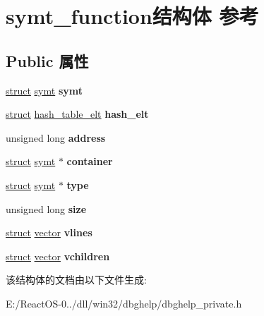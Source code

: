 \hypertarget{structsymt__function}{}\section{symt\+\_\+function结构体 参考}
\label{structsymt__function}
\subsection*{Public 属性}
\begin{DoxyCompactItemize}
\item 
\mbox{\label{structsymt__function_ab8e0ecde813260484098765a2e58fce7}} 
\hyperlink{interfacestruct}{struct} \hyperlink{structsymt}{symt} {\bfseries symt}
\item 
\mbox{\label{structsymt__function_a8b698ed85d7d9eef5dfd84605f43b484}} 
\hyperlink{interfacestruct}{struct} \hyperlink{structhash__table__elt}{hash\+\_\+table\+\_\+elt} {\bfseries hash\+\_\+elt}
\item 
\mbox{\label{structsymt__function_a9ab1fce58054ec492faecba2ad368433}} 
unsigned long {\bfseries address}
\item 
\mbox{\label{structsymt__function_acf8d323e19bd1b8bf5462a8b9cfa353b}} 
\hyperlink{interfacestruct}{struct} \hyperlink{structsymt}{symt} $\ast$ {\bfseries container}
\item 
\mbox{\label{structsymt__function_a9fd7193e227e518dcaa3842133b3344e}} 
\hyperlink{interfacestruct}{struct} \hyperlink{structsymt}{symt} $\ast$ {\bfseries type}
\item 
\mbox{\label{structsymt__function_a7de13c1133898a65769144ee4a3bbf48}} 
unsigned long {\bfseries size}
\item 
\mbox{\label{structsymt__function_a16e4049d892bfe90f65761cf4b6ece49}} 
\hyperlink{interfacestruct}{struct} \hyperlink{structvector}{vector} {\bfseries vlines}
\item 
\mbox{\label{structsymt__function_a57eacfb534aafd9bbcea7e070b87143d}} 
\hyperlink{interfacestruct}{struct} \hyperlink{structvector}{vector} {\bfseries vchildren}
\end{DoxyCompactItemize}


该结构体的文档由以下文件生成\+:\begin{DoxyCompactItemize}
\item 
E\+:/\+React\+O\+S-\/0../dll/win32/dbghelp/dbghelp\+\_\+private.\+h\end{DoxyCompactItemize}
